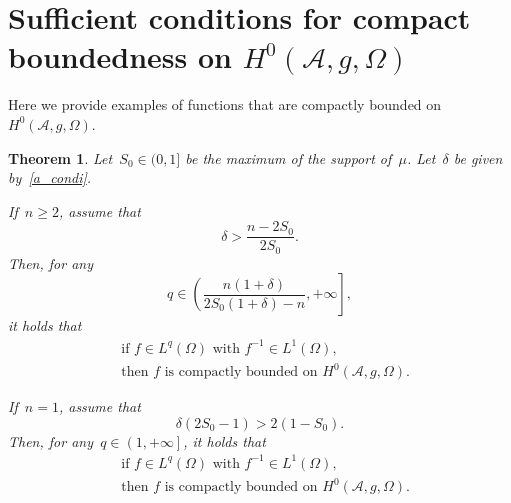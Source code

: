\documentclass[11pt,hyp,]{nyjm}
\numberwithin{equation}{section}
\newtheorem{theorem}{Theorem}[section]
\theoremstyle{remark}
\renewcommand{\ge}{\geqslant}
\begin{document}
\appendix

\section{Sufficient conditions for compact boundedness on $H^0(\mathcal{A}, g, \Omega)$}
\label{sappend}

Here we provide examples of functions that are compactly bounded on $H^0(\mathcal{A}, g, \Omega)$.

\begin{theorem}\label{mcza}
Let~$S_0\in (0,1]$ be the maximum of the support of~$\mu$. Let~$\delta$ be given by~\eqref{a_condi}.

If~$n\ge2$, assume that
\begin{equation}\label{jsd}
\delta> \frac{n-2S_0}{2S_0}.
\end{equation}
Then, for any
\begin{equation}\label{em1}
q \in \left( \frac{n(1+\delta)}{2S_0(1+\delta)-n}, + \infty \right],
\end{equation}
it holds that
\begin{equation}\label{lik}\begin{split}&
{\mbox{if~$f\in L^{q}(\Omega)$ with~$f^{-1}\in L^1(\Omega)$,}}\\& {\mbox{then~$f$ is compactly bounded on~$H^0(\mathcal{A},g,\Omega)$.}}\end{split}
\end{equation}

If~$n=1$, assume that
\begin{equation}\label{puj}
\delta (2S_0-1)> 2(1-S_0).
\end{equation}
Then, for any~$q \in \left( 1, + \infty \right]$, it holds that
\begin{equation}\label{hfm}\begin{split}&
{\mbox{if~$f\in L^{q}(\Omega)$ with~$f^{-1}\in L^1(\Omega)$,}}\\&{\mbox{then~$f$ is compactly bounded on~$H^0(\mathcal{A},g,\Omega)$.}}\end{split}
\end{equation}
\end{theorem}
\end{document}
